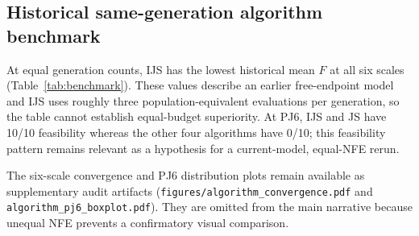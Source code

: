 \documentclass[preprint,12pt]{elsarticle}
\begin{document}
\subsection{Historical same-generation algorithm benchmark}

At equal generation counts, IJS has the lowest historical mean $F$ at all six scales (Table~\ref{tab:benchmark}). These values describe an earlier free-endpoint model and IJS uses roughly three population-equivalent evaluations per generation, so the table cannot establish equal-budget superiority. At PJ6, IJS and JS have 10/10 feasibility whereas the other four algorithms have 0/10; this feasibility pattern remains relevant as a hypothesis for a current-model, equal-NFE rerun.

\begin{table}[t]
\centering
\caption{Historical objective mean (SD) over ten runs. Equal generations do not mean equal NFE.}
\label{tab:benchmark}
\scriptsize
{}
\end{table}

The six-scale convergence and PJ6 distribution plots remain available as supplementary audit artifacts (\texttt{figures/algorithm\_convergence.pdf} and \texttt{algorithm\_pj6\_boxplot.pdf}). They are omitted from the main narrative because unequal NFE prevents a confirmatory visual comparison.
\end{document}
